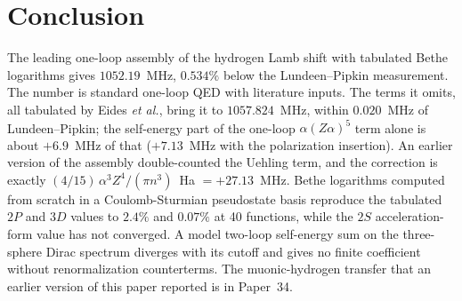 \documentclass[11pt]{article}
\begin{document}
\section{Conclusion}
\label{sec:conclusion}

The leading one-loop assembly of the hydrogen Lamb shift with tabulated
Bethe logarithms gives $1052.19$~MHz, $0.534\%$ below the
Lundeen--Pipkin measurement.  The number is standard one-loop QED with
literature inputs.  The terms it omits, all tabulated by Eides
\emph{et al.}, bring it to $1057.824$~MHz, within $0.020$~MHz of
Lundeen--Pipkin; the self-energy part of the one-loop $\alpha(Z\alpha)^5$
term alone is about $+6.9$~MHz of that ($+7.13$~MHz with the polarization insertion).  An earlier
version of the assembly double-counted the Uehling term, and the
correction is exactly $(4/15)\,\alpha^3 Z^4/(\pi n^3)$~Ha
$= +27.13$~MHz.  Bethe logarithms computed from scratch in a
Coulomb-Sturmian pseudostate basis reproduce the tabulated $2P$ and
$3D$ values to $2.4\%$ and $0.07\%$ at 40 functions, while the $2S$
acceleration-form value has not converged.  A model two-loop
self-energy sum on the three-sphere Dirac spectrum diverges with its
cutoff and gives no finite coefficient without renormalization
counterterms.  The muonic-hydrogen transfer that an earlier version of
this paper reported is in Paper~34.
\end{document}
